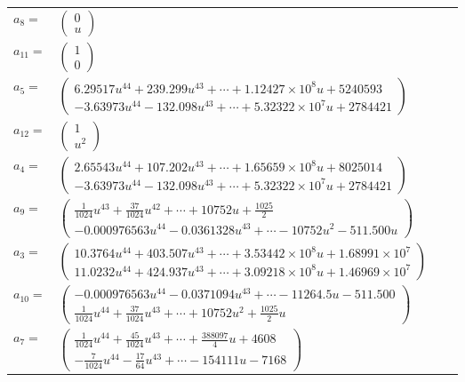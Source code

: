 \documentclass[1p]{elsarticle_modified}
\theoremstyle{definition}
\begin{document}
\begin{tabular}{m{7pt} m{180pt} m{7pt} m{180pt} }
\flushright $a_{8}=$&$\begin{pmatrix}0\\u\end{pmatrix}$ \\
\flushright $a_{11}=$&$\begin{pmatrix}1\\0\end{pmatrix}$ \\
\flushright $a_{5}=$&$\begin{pmatrix}6.29517 u^{44}+239.299 u^{43}+\cdots+1.12427\times10^{8} u+5240593\\-3.63973 u^{44}-132.098 u^{43}+\cdots+5.32322\times10^{7} u+2784421\end{pmatrix}$ \\
\flushright $a_{12}=$&$\begin{pmatrix}1\\u^2\end{pmatrix}$ \\
\flushright $a_{4}=$&$\begin{pmatrix}2.65543 u^{44}+107.202 u^{43}+\cdots+1.65659\times10^{8} u+8025014\\-3.63973 u^{44}-132.098 u^{43}+\cdots+5.32322\times10^{7} u+2784421\end{pmatrix}$ \\
\flushright $a_{9}=$&$\begin{pmatrix}\frac{1}{1024} u^{43}+\frac{37}{1024} u^{42}+\cdots+10752 u+\frac{1025}{2}\\-0.000976563 u^{44}-0.0361328 u^{43}+\cdots-10752 u^{2}-511.500 u\end{pmatrix}$ \\
\flushright $a_{3}=$&$\begin{pmatrix}10.3764 u^{44}+403.507 u^{43}+\cdots+3.53442\times10^{8} u+1.68991\times10^{7}\\11.0232 u^{44}+424.937 u^{43}+\cdots+3.09218\times10^{8} u+1.46969\times10^{7}\end{pmatrix}$ \\
\flushright $a_{10}=$&$\begin{pmatrix}-0.000976563 u^{44}-0.0371094 u^{43}+\cdots-11264.5 u-511.500\\\frac{1}{1024} u^{44}+\frac{37}{1024} u^{43}+\cdots+10752 u^2+\frac{1025}{2} u\end{pmatrix}$ \\
\flushright $a_{7}=$&$\begin{pmatrix}\frac{1}{1024} u^{44}+\frac{45}{1024} u^{43}+\cdots+\frac{388097}{4} u+4608\\-\frac{7}{1024} u^{44}-\frac{17}{64} u^{43}+\cdots-154111 u-7168\end{pmatrix}$ \\

\end{tabular}
\end{document}
